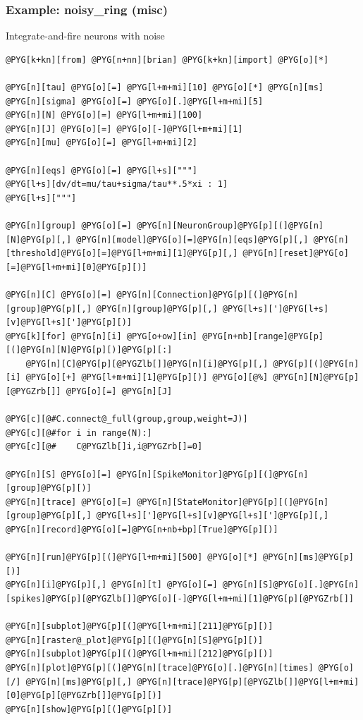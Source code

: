 \documentclass[letterpaper,10pt,english]{manual}
\begin{document}
\resetcurrentobjects
\hypertarget{--doc-examples-misc_noisy_ring}{}

\hypertarget{index-57}{}\subsubsection{Example: noisy\_ring (misc)}

Integrate-and-fire neurons with noise

\begin{Verbatim}[commandchars=@\[\]]
@PYG[k+kn][from] @PYG[n+nn][brian] @PYG[k+kn][import] @PYG[o][*]

@PYG[n][tau] @PYG[o][=] @PYG[l+m+mi][10] @PYG[o][*] @PYG[n][ms]
@PYG[n][sigma] @PYG[o][=] @PYG[o][.]@PYG[l+m+mi][5]
@PYG[n][N] @PYG[o][=] @PYG[l+m+mi][100]
@PYG[n][J] @PYG[o][=] @PYG[o][-]@PYG[l+m+mi][1]
@PYG[n][mu] @PYG[o][=] @PYG[l+m+mi][2]

@PYG[n][eqs] @PYG[o][=] @PYG[l+s]["""]
@PYG[l+s][dv/dt=mu/tau+sigma/tau**.5*xi : 1]
@PYG[l+s]["""]

@PYG[n][group] @PYG[o][=] @PYG[n][NeuronGroup]@PYG[p][(]@PYG[n][N]@PYG[p][,] @PYG[n][model]@PYG[o][=]@PYG[n][eqs]@PYG[p][,] @PYG[n][threshold]@PYG[o][=]@PYG[l+m+mi][1]@PYG[p][,] @PYG[n][reset]@PYG[o][=]@PYG[l+m+mi][0]@PYG[p][)]

@PYG[n][C] @PYG[o][=] @PYG[n][Connection]@PYG[p][(]@PYG[n][group]@PYG[p][,] @PYG[n][group]@PYG[p][,] @PYG[l+s][']@PYG[l+s][v]@PYG[l+s][']@PYG[p][)]
@PYG[k][for] @PYG[n][i] @PYG[o+ow][in] @PYG[n+nb][range]@PYG[p][(]@PYG[n][N]@PYG[p][)]@PYG[p][:]
    @PYG[n][C]@PYG[p][@PYGZlb[]]@PYG[n][i]@PYG[p][,] @PYG[p][(]@PYG[n][i] @PYG[o][+] @PYG[l+m+mi][1]@PYG[p][)] @PYG[o][@%] @PYG[n][N]@PYG[p][@PYGZrb[]] @PYG[o][=] @PYG[n][J]

@PYG[c][@#C.connect@_full(group,group,weight=J)]
@PYG[c][@#for i in range(N):]
@PYG[c][@#    C@PYGZlb[]i,i@PYGZrb[]=0]

@PYG[n][S] @PYG[o][=] @PYG[n][SpikeMonitor]@PYG[p][(]@PYG[n][group]@PYG[p][)]
@PYG[n][trace] @PYG[o][=] @PYG[n][StateMonitor]@PYG[p][(]@PYG[n][group]@PYG[p][,] @PYG[l+s][']@PYG[l+s][v]@PYG[l+s][']@PYG[p][,] @PYG[n][record]@PYG[o][=]@PYG[n+nb+bp][True]@PYG[p][)]

@PYG[n][run]@PYG[p][(]@PYG[l+m+mi][500] @PYG[o][*] @PYG[n][ms]@PYG[p][)]
@PYG[n][i]@PYG[p][,] @PYG[n][t] @PYG[o][=] @PYG[n][S]@PYG[o][.]@PYG[n][spikes]@PYG[p][@PYGZlb[]]@PYG[o][-]@PYG[l+m+mi][1]@PYG[p][@PYGZrb[]]

@PYG[n][subplot]@PYG[p][(]@PYG[l+m+mi][211]@PYG[p][)]
@PYG[n][raster@_plot]@PYG[p][(]@PYG[n][S]@PYG[p][)]
@PYG[n][subplot]@PYG[p][(]@PYG[l+m+mi][212]@PYG[p][)]
@PYG[n][plot]@PYG[p][(]@PYG[n][trace]@PYG[o][.]@PYG[n][times] @PYG[o][/] @PYG[n][ms]@PYG[p][,] @PYG[n][trace]@PYG[p][@PYGZlb[]]@PYG[l+m+mi][0]@PYG[p][@PYGZrb[]]@PYG[p][)]
@PYG[n][show]@PYG[p][(]@PYG[p][)]
\end{Verbatim}
\end{document}
